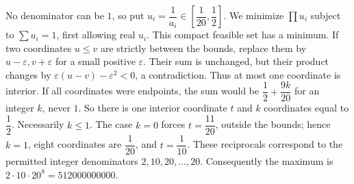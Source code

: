 No denominator can be $1$, so put $u_i=\dfrac{1}{a_i}\in[\dfrac{1}{20},\dfrac{1}{2}]$. We minimize $\prod u_i$ subject to $\sum u_i=1$, first allowing real $u_i$. This compact feasible set has a minimum. If two coordinates $u\le v$ are strictly between the bounds, replace them by $u-\varepsilon,v+\varepsilon$ for a small positive $\varepsilon$. Their sum is unchanged, but their product changes by $\varepsilon(u-v)-\varepsilon^2<0$, a contradiction. Thus at most one coordinate is interior. If all coordinates were endpoints, the sum would be $\dfrac{1}{2}+\dfrac{9k}{20}$ for an integer $k$, never $1$. So there is one interior coordinate $t$ and $k$ coordinates equal to $\dfrac{1}{2}$. Necessarily $k\le1$. The case $k=0$ forces $t=\dfrac{11}{20}$, outside the bounds; hence $k=1$, eight coordinates are $\dfrac{1}{20}$, and $t=\dfrac{1}{10}$. These reciprocals correspond to the permitted integer denominators $2,10,20,\ldots,20$. Consequently the maximum is $2\cdot10\cdot20^8=\boxed{512000000000}$.
